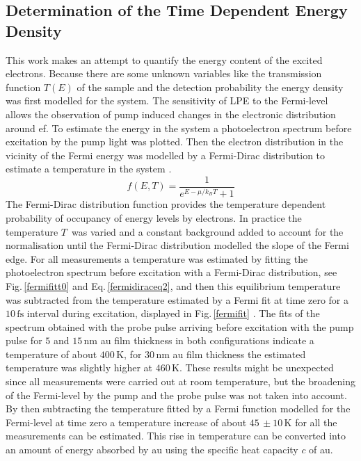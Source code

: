 \documentclass[a4paper,12pt,twoside]{article}
\begin{document}
\subsection{Determination of the Time Dependent Energy Density}
    \label{chapEED}
This work makes an attempt to quantify the energy content of the excited electrons. Because there are some unknown variables like the transmission function $T(E)$ of the sample and the detection probability the energy density was first modelled for the system. The sensitivity of \gls{LPE} to the Fermi-level allows the observation of pump induced changes in the electronic distribution around \gls{ef}.
To estimate the energy in the system a photoelectron spectrum before excitation by the pump light was plotted. Then the electron distribution in the vicinity of the Fermi energy was modelled by a Fermi-Dirac distribution to estimate a temperature in the system \cite{H.Ibach2008}.
    \begin{equation}
        \label{fermidiraceq2}
        f(E,T) = \frac{ 1 }{ e^{ E-\mu/ k_{ B  }T }+1}
    \end{equation} 
The Fermi-Dirac distribution function provides the temperature dependent probability of occupancy of energy levels by electrons. In practice the temperature $T$\, was varied and a constant background added to account for the normalisation until the Fermi-Dirac distribution modelled the slope of the Fermi edge. For all measurements a temperature was estimated by fitting the photoelectron spectrum before excitation with a Fermi-Dirac distribution, see Fig.\,\ref{fermifitt0} and Eq.\,\ref{fermidiraceq2}, and then this equilibrium temperature was subtracted from the temperature estimated by a Fermi fit at time zero for a $10\,\mathrm{fs}$ interval during excitation, displayed in Fig.\,\ref{fermifit} \cite{H.Ibach2008}. The fits of the spectrum obtained with the probe pulse arriving before excitation with the pump pulse for $5$ and $15\,\mathrm{nm}$ \gls{au} film thickness in both configurations indicate a temperature of about $400\,\mathrm{K}$, for $30\,\mathrm{nm}$ \gls{au} film thickness the estimated temperature was slightly higher at $460\,\mathrm{K}$. These results might be unexpected since all measurements were carried out at room temperature, but the broadening of the Fermi-level by the pump and the probe pulse was not taken into account. By then subtracting the temperature fitted by a Fermi function modelled for the Fermi-level at time zero a temperature increase of about $45\,\pm10\,\mathrm{K}$ for all the measurements can be estimated. This rise in temperature can be converted into an  amount of energy absorbed by \gls{au} using the specific heat capacity $c$ of \gls{au}.
\end{document}
